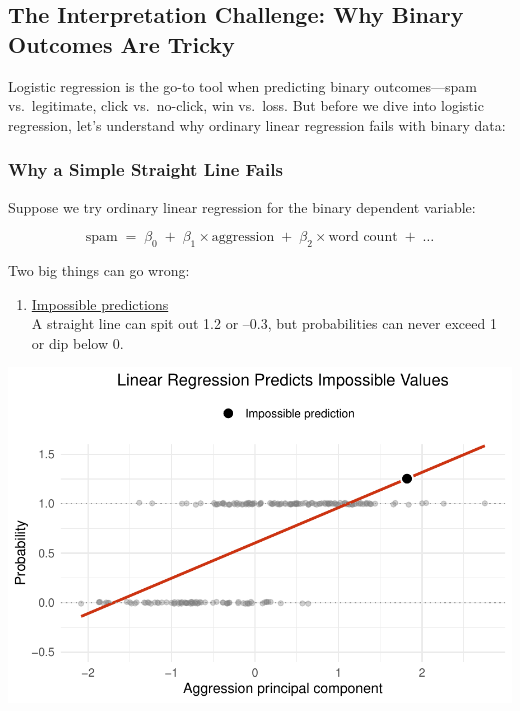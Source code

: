 \documentclass[
  letterpaper,
  DIV=11,
  numbers=noendperiod]{scrartcl}
\providecommand{\tightlist}{%
  \setlength{\itemsep}{0pt}\setlength{\parskip}{0pt}}\usepackage{longtable,booktabs,array}
\begin{document}
\subsection{\texorpdfstring{The Interpretation Challenge: Why Binary
Outcomes Are
Tricky}{The Interpretation Challenge:   Why Binary Outcomes Are Tricky}}\label{the-interpretation-challenge-why-binary-outcomes-are-tricky}

Logistic regression is the go-to tool when predicting binary
outcomes---spam vs.~legitimate, click vs.~no-click, win vs.~loss. But
before we dive into logistic regression, let's understand why ordinary
linear regression fails with binary data:

\subsubsection{Why a Simple Straight Line
Fails}\label{why-a-simple-straight-line-fails}

Suppose we try ordinary linear regression for the binary dependent
variable:

\[
\text{spam} \;=\; \beta_0 \;+\; \beta_1 \times \text{aggression}
                 \;+\; \beta_2 \times \text{word count} \;+\; \dots
\]

Two big things can go wrong:

\begin{enumerate}
\def\labelenumi{\arabic{enumi}.}
\tightlist
\item
  \ul{Impossible predictions}\\
  A straight line can spit out 1.2 or --0.3, but probabilities can never
  exceed 1 or dip below 0.
\end{enumerate}

\begin{center}
\includegraphics[width=0.8\linewidth,height=\textheight,keepaspectratio]{Beyond!!!_files/figure-pdf/unnamed-chunk-2-1.pdf}
\end{center}
\end{document}
